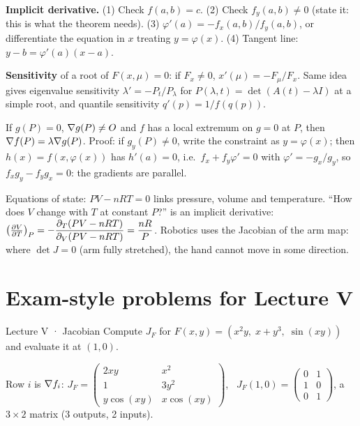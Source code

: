 \begin{method}
\textbf{Implicit derivative.} (1) Check $f(a,b)=c$. (2) Check $f_y(a,b)\ne0$ (state it: this is
what the theorem needs). (3) $\varphi'(a)=-f_x(a,b)/f_y(a,b)$, or differentiate the equation in $x$
treating $y=\varphi(x)$. (4) Tangent line: $y-b=\varphi'(a)(x-a)$.

\textbf{Sensitivity} of a root of $F(x,\mu)=0$: if $F_x\ne0$, $x'(\mu)=-F_\mu/F_x$. Same idea gives
eigenvalue sensitivity $\lambda'=-P_t/P_\lambda$ for $P(\lambda,t)=\det(A(t)-\lambda I)$ at a simple
root, and quantile sensitivity $q'(p)=1/f(q(p))$.
\end{method}

\begin{thm}
If $g(P)=0$, $\nabla g(P)\ne O$ and $f$ has a local extremum on $g=0$ at $P$, then
$\nabla f(P)=\lambda\nabla g(P)$. Proof: if $g_y(P)\ne0$, write the constraint as $y=\varphi(x)$; then
$h(x)=f(x,\varphi(x))$ has $h'(a)=0$, i.e.\ $f_x+f_y\varphi'=0$ with $\varphi'=-g_x/g_y$, so
$f_xg_y-f_yg_x=0$: the gradients are parallel.
\end{thm}

\begin{reallife}
Equations of state: $PV-nRT=0$ links pressure, volume and temperature. ``How does $V$ change
with $T$ at constant $P$?'' is an implicit derivative:
$\left(\frac{\partial V}{\partial T}\right)_P=-\dfrac{\partial_T(PV-nRT)}{\partial_V(PV-nRT)}=\dfrac{nR}{P}$. Robotics uses
the Jacobian of the arm map: where $\det J=0$ (arm fully stretched), the hand cannot move in
some direction.
\end{reallife}

\section{Exam-style problems for Lecture V}

\begin{problem}{Lecture V · Jacobian}
Compute $J_F$ for $F(x,y)=(x^2y,\;x+y^3,\;\sin(xy))$ and evaluate it at $(1,0)$.
\end{problem}
\begin{solution}
Row $i$ is $\nabla f_i$:
$J_F=\begin{pmatrix}2xy&x^2\\1&3y^2\\y\cos(xy)&x\cos(xy)\end{pmatrix}$, \
$J_F(1,0)=\begin{pmatrix}0&1\\1&0\\0&1\end{pmatrix}$, a $3\times2$ matrix (3 outputs, 2 inputs).
\end{solution}

